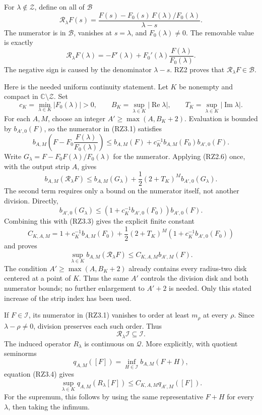 \documentclass[
]{article}
\newcounter{none} %
\begin{document}
For \(\lambda\notin\mathscr Z\), define on all of \(\mathcal B\) \[
\boxed{\quad
\mathscr R_\lambda F(s)=
\frac{F(s)-F_0(s)\,F(\lambda)/F_0(\lambda)}
{\lambda-s}.
\quad}
\tag{RZ3.1}
\] The numerator is in \(\mathcal B\), vanishes at \(s=\lambda\), and
\(F_0(\lambda)\ne0\). The removable value is exactly \[
\mathscr R_\lambda F(\lambda)
=-F'(\lambda)+F_0'(\lambda)\frac{F(\lambda)}{F_0(\lambda)}.
\tag{RZ3.2}
\] The negative sign is caused by the denominator \(\lambda-s\). RZ2
proves that \(\mathscr R_\lambda F\in\mathcal B\).

Here is the needed uniform continuity statement. Let \(K\) be nonempty
and compact in \(\mathbb C\setminus\mathscr Z\). Set \[
c_K=\min_{\lambda\in K}|F_0(\lambda)|>0,\qquad
B_K=\sup_{\lambda\in K}|\operatorname{Re}\lambda|,\qquad
T_K=\sup_{\lambda\in K}|\operatorname{Im}\lambda|.
\] For each \(A,M\), choose an integer \(A'\geq\max(A,B_K+2)\).
Evaluation is bounded by \(b_{A',0}(F)\), so the numerator in (RZ3.1)
satisfies \[
b_{A,M}\!\left(F-F_0\frac{F(\lambda)}{F_0(\lambda)}\right)
\leq b_{A,M}(F)+c_K^{-1}b_{A,M}(F_0)b_{A',0}(F).
\tag{RZ3.3}
\] Write \(G_\lambda=F-F_0F(\lambda)/F_0(\lambda)\) for the numerator.
Applying (RZ2.6) once, with the output strip \(A\), gives \[
b_{A,M}(\mathscr R_\lambda F)
\leq b_{A,M}(G_\lambda)
+\frac12(2+T_K)^M b_{A',0}(G_\lambda).
\] The second term requires only a bound on the numerator itself, not
another division. Directly, \[
b_{A',0}(G_\lambda)
\leq\left(1+c_K^{-1}b_{A',0}(F_0)\right)b_{A',0}(F).
\] Combining this with (RZ3.3) gives the explicit finite constant \[
C_{K,A,M}
=1+c_K^{-1}b_{A,M}(F_0)
+\frac12(2+T_K)^M
\left(1+c_K^{-1}b_{A',0}(F_0)\right)
\] and proves \[
\sup_{\lambda\in K}b_{A,M}(\mathscr R_\lambda F)
\leq C_{K,A,M}b_{A',M}(F).
\tag{RZ3.4}
\] The condition \(A'\geq\max(A,B_K+2)\) already contains every
radius-two disk centered at a point of \(K\). Thus the same \(A'\)
controls the division disk and both numerator bounds; no further
enlargement to \(A'+2\) is needed. Only this stated increase of the
strip index has been used.

If \(F\in\mathcal I\), its numerator in (RZ3.1) vanishes to order at
least \(m_\rho\) at every \(\rho\). Since \(\lambda-\rho\ne0\), division
preserves each such order. Thus \[
\mathscr R_\lambda\mathcal I\subseteq\mathcal I.
\tag{RZ3.5}
\] The induced operator \(R_\lambda\) is continuous on \(\mathcal Q\).
More explicitly, with quotient seminorms \[
q_{A,M}([F])=\inf_{H\in\mathcal I}b_{A,M}(F+H),
\] equation (RZ3.4) gives \[
\sup_{\lambda\in K}q_{A,M}(R_\lambda[F])
\leq C_{K,A,M}q_{A',M}([F]).
\tag{RZ3.6}
\] For the supremum, this follows by using the same representative
\(F+H\) for every \(\lambda\), then taking the infimum.
\end{document}
